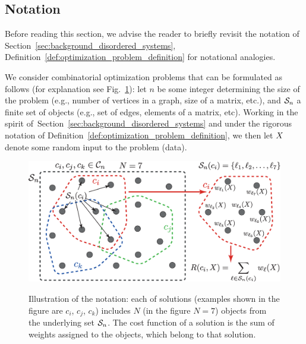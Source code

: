 \subsection{Notation}
\label{sec:free_setting_notation}

\myremark Before reading this section, we advise the reader to briefly revisit 
the notation of Section~\ref{sec:background_disordered_systems},
Definition~\ref{def:optimization_problem_definition} for notational analogies.

We consider combinatorial optimization problems that can be formulated as
follows (for explanation see Fig.~\ref{fig:notation_explained}): let $n$ be some
integer determining the size of the problem (e.g., number of vertices in a
graph, size of a matrix, etc.), and $\S_n$ a finite set of objects (e.g., set of
edges, elements of a matrix, etc). Working in the spirit
of~Section~\ref{sec:background_disordered_systems} and under the rigorous
notation of Definition~\ref{def:optimization_problem_definition}, we then let
$\data$ denote some random input to the problem (data).
%
%

\begin{figure}[htbp]
  \centering
  \noindent\includegraphics[width=.9\textwidth]{figures/ch_free_energy/solution_set_illustration} 
  \\[.5cm]
  \caption{Illustration of the notation: each of solutions (examples shown in the figure
  are $c_i$, $c_j$, $c_k$) includes $N$ (in the figure $N = 7$) objects from the
  underlying set $\S_n$. The cost function of a solution is the sum of weights
  assigned to the objects, which belong to that solution.}
  \label{fig:notation_explained}
\end{figure}

